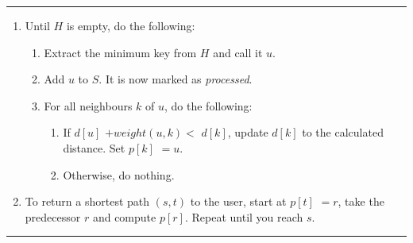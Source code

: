 \documentclass[aspectratio=169]{beamer}
\begin{document}
\begin{frame}
    \vspace{2mm}
    \hrule
    \begin{enumerate}
         \item Until \colorbox{red-400}{$H$} is empty, do the following:
              \begin{enumerate}
                   \item Extract the minimum key from \colorbox{red-400}{$H$} and call it $u$.
                   \item Add $u$ to \colorbox{indigo-300}{$S$}. It is now marked as \textit{processed}.
                   \item For all neighbours $k$ of $u$, do the following:
                        \begin{enumerate}
                             \item If \colorbox{blue-300}{$d[u]$} $ + weight(u,k) < $ \colorbox{blue-300}{$d[k]$}, update \colorbox{blue-300}{$d[k]$} to the
                             calculated distance. Set \colorbox{green-300}{$p[k]$} $ = u$.
                             \item Otherwise, do nothing.
                        \end{enumerate}
              \end{enumerate}
        \item To return a shortest path $(s,t)$ to the user, start at \colorbox{green-300}{$p[t]$} $ = r$, take the predecessor $r$ and compute \colorbox{green-300}{$p[r]$}. Repeat until you reach $s$.
    \end{enumerate}
    \hrule
\end{frame}
\end{document}
